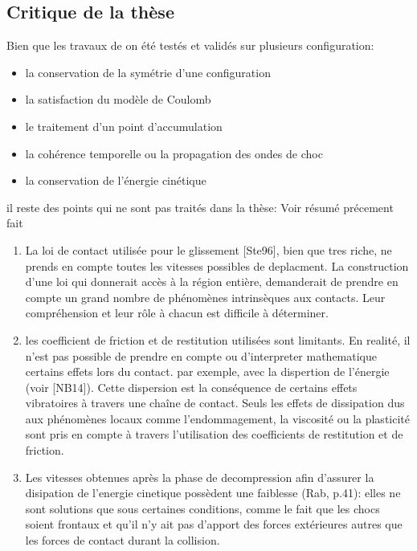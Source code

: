 \subsection{Critique de la thèse}
Bien que les travaux de \citeauthor{rabatel2015thesis} on été testés et validés sur plusieurs configuration: 
\begin{itemize}
    \item la conservation de la symétrie d’une configuration
    \item la satisfaction du modèle de Coulomb
    \item le traitement d’un point d’accumulation
    \item la cohérence temporelle ou la propagation des ondes de choc
    \item la conservation de l’énergie cinétique
\end{itemize}
il reste des points qui ne sont pas traités dans la thèse:
Voir résumé précement fait
\begin{enumerate}
    \item La loi de contact utilisée pour le glissement [Ste96], bien que tres riche, ne prends en compte toutes les vitesses possibles de deplacment. La construction d’une loi qui donnerait accès à la région entière, demanderait de prendre en compte un grand nombre de phénomènes intrinsèques aux contacts. Leur compréhension et leur rôle à chacun est difficile à déterminer. 
    \item les coefficient de friction et de restitution utilisées sont limitants. En realité, il n’est pas possible de prendre en compte ou d'interpreter mathematique certains effets lors du contact. par exemple, avec la dispertion de l'énergie (voir [NB14]). Cette dispersion est la conséquence de certains effets vibratoires à travers une chaîne de contact. Seuls les effets de dissipation dus aux phénomènes locaux comme l’endommagement, la viscosité ou la plasticité sont pris en compte à travers l’utilisation des coefficients de restitution et de friction.
    \item Les vitesses obtenues après la phase de decompression afin d'assurer la disipation de l'energie cinetique possèdent une faiblesse (Rab, p.41): elles ne sont solutions que sous certaines conditions, comme le fait que les chocs soient frontaux
    et qu’il n’y ait pas d’apport des forces extérieures autres que les forces de contact durant la collision.
\end{enumerate}

